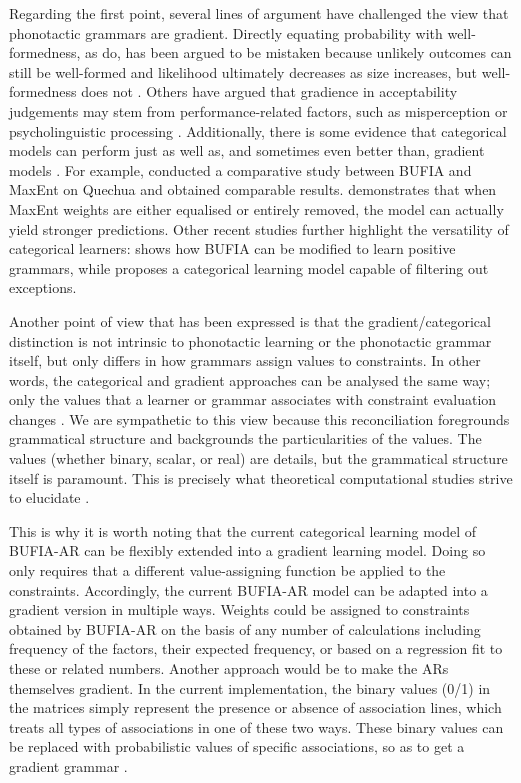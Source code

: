 Regarding the first point, several lines of argument have challenged
the view that phonotactic grammars are gradient. Directly equating
probability with well-formedness, as \citet{hayes2008maximum} do, has
been argued to be mistaken because unlikely outcomes can still be
well-formed and likelihood ultimately decreases as size increases, but
well-formedness does not \citep{heinz2017computational}. Others have
argued that gradience in acceptability judgements may stem from
performance-related factors, such as misperception
\citep{kahng2023can} or psycholinguistic processing
\citep{Gorman2013}. Additionally, there is some evidence that
categorical models can perform just as well as, and sometimes even
better than, gradient models \citep{Gorman2013, Durvasula2020,
	KostyszynHeinz2021, Dai2025, Swanson+2025,durvasula2025closer}. For
example, \citet{Swanson+2025} conducted a comparative study between
BUFIA and MaxEnt on Quechua \citep{wilson2018accidental} and obtained
comparable results. \citet{durvasula2025closer} demonstrates that when
MaxEnt weights are either equalised or entirely removed, the model can
actually yield stronger predictions. Other recent studies further
highlight the versatility of categorical learners:
\citet{payne2024generalized} shows how BUFIA can be modified to learn
positive grammars, while \citet{Dai2025} proposes a categorical
learning model capable of filtering out exceptions.

Another point of view that has been expressed is that the
gradient/categorical distinction is not intrinsic to phonotactic
learning or the phonotactic grammar itself, but only differs in how
grammars assign values to constraints. In other words, the categorical
and gradient approaches can be analysed the same way; only the values
that a learner or grammar associates with constraint evaluation
changes \citep{goodman1999semiring, chandlee2017computational,
	mayerReconciling2025}. We are sympathetic to this view because this
reconciliation foregrounds grammatical structure and backgrounds the
particularities of the values. The values (whether binary, scalar, or
real) are details, but the grammatical structure itself is
paramount. This is precisely what theoretical computational studies
strive to elucidate \citep{heinz2018computational}.

This is why it is worth noting that the current categorical learning
model of BUFIA-AR can be flexibly extended into a gradient learning
model. Doing so only requires that a different value-assigning
function be applied to the constraints. Accordingly, the current
BUFIA-AR model can be adapted into a gradient version in multiple
ways. Weights could be assigned to constraints obtained by BUFIA-AR on
the basis of any number of calculations including frequency of the
factors, their expected frequency, or based on a regression fit to
these or related numbers. Another approach would be to make the ARs
themselves gradient. In the current implementation, the binary values
(0/1) in the matrices simply represent the presence or absence of
association lines, which treats all types of associations in one of
these two ways. These binary values can be replaced with probabilistic
values of specific associations, so as to get a gradient grammar
\citep{SmolenskyGoldrick2013, Mayer2021}.

